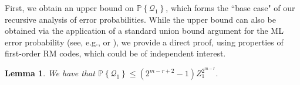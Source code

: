 \documentclass[conference,letterpaper]{IEEEtran}
\newcommand{\cQ}{\ensuremath{\mathcal{Q}}}
\newcommand{\PR}[1]{{\mathbb{P}}\left\{ #1\right\}}
\newtheorem{lemma}[theorem]{Lemma}
\begin{document}
First, we obtain an upper bound on $\PR{ \cQ_1}$, which forms the ``base case" of our recursive analysis of error probabilities. While the upper bound can also be obtained via the application of a standard union bound argument for the ML error probability (see, e.g., \cite[Sec. 2.1]{sason-shamai} or \cite[Problem 1.21]{mct}), we provide a direct proof, using properties of first-order RM codes, which could be of independent interest.
\begin{lemma}\label{lem:Q1}
     We have that
$
        \PR{ \cQ_1}  \leq (2 ^ { m -r + 2  } - 1 ) Z_1^{2^{m-r}}.
$

\end{lemma}
\end{document}
